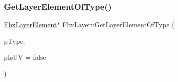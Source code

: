 \subsubsection{\texorpdfstring{Get\+Layer\+Element\+Of\+Type()}{GetLayerElementOfType()}\hspace{0.1cm}{\footnotesize\ttfamily [1/2]}}
{\footnotesize\ttfamily \hyperlink{class_fbx_layer_element}{Fbx\+Layer\+Element}$\ast$ Fbx\+Layer\+::\+Get\+Layer\+Element\+Of\+Type (\begin{DoxyParamCaption}\item[{\hyperlink{class_fbx_layer_element_a8c95c5cd880b56c776acd379bd86f42c}{Fbx\+Layer\+Element\+::\+E\+Type}}]{p\+Type,  }\item[{bool}]{p\+Is\+UV = {\ttfamily false} }\end{DoxyParamCaption})}

